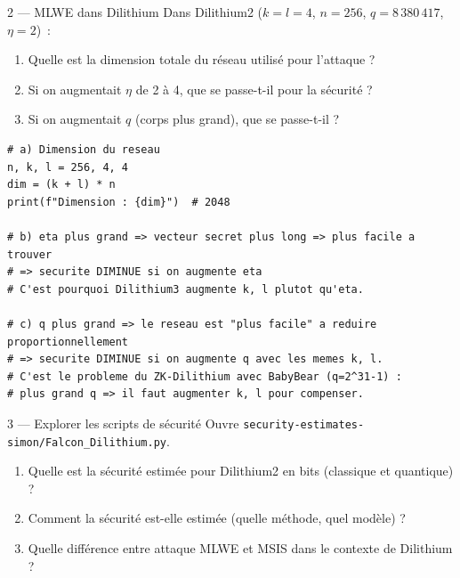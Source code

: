\documentclass[12pt, a4paper]{article}
\begin{document}
\begin{exercice}{2 --- MLWE dans Dilithium}
Dans Dilithium2 ($k=l=4$, $n=256$, $q=8\,380\,417$, $\eta=2$)~:
\begin{enumerate}[label=\alph*)]
  \item Quelle est la dimension totale du réseau utilisé pour l'attaque ?
  \item Si on augmentait $\eta$ de 2 à 4, que se passe-t-il pour la sécurité ?
  \item Si on augmentait $q$ (corps plus grand), que se passe-t-il ?
\end{enumerate}
\end{exercice}

\begin{solution}
\begin{lstlisting}[style=python]
# a) Dimension du reseau
n, k, l = 256, 4, 4
dim = (k + l) * n
print(f"Dimension : {dim}")  # 2048

# b) eta plus grand => vecteur secret plus long => plus facile a trouver
# => securite DIMINUE si on augmente eta
# C'est pourquoi Dilithium3 augmente k, l plutot qu'eta.

# c) q plus grand => le reseau est "plus facile" a reduire proportionnellement
# => securite DIMINUE si on augmente q avec les memes k, l.
# C'est le probleme du ZK-Dilithium avec BabyBear (q=2^31-1) :
# plus grand q => il faut augmenter k, l pour compenser.
\end{lstlisting}
\end{solution}

\begin{exercice}{3 --- Explorer les scripts de sécurité}
Ouvre \texttt{security-estimates-simon/Falcon\_Dilithium.py}.
\begin{enumerate}[label=\alph*)]
  \item Quelle est la sécurité estimée pour Dilithium2 en bits (classique et quantique) ?
  \item Comment la sécurité est-elle estimée (quelle méthode, quel modèle) ?
  \item Quelle différence entre attaque MLWE et MSIS dans le contexte de Dilithium ?
\end{enumerate}
\end{exercice}
\end{document}

